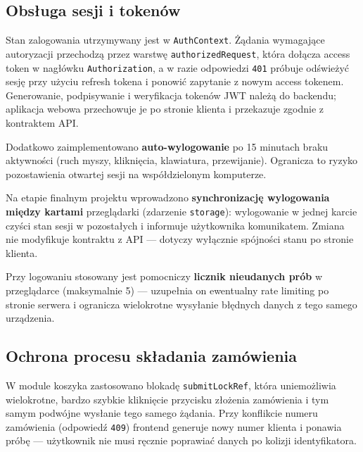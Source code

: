 \documentclass[12pt,a4paper]{report}
\newenvironment{calosc}{%
  \Needspace{17\baselineskip}%
  \begin{samepage}%
}{%
  \end{samepage}%
}
\begin{document}
\begin{calosc}
\section{Obsługa sesji i tokenów}

Stan zalogowania utrzymywany jest w \texttt{AuthContext}. Żądania wymagające autoryzacji przechodzą przez warstwę \texttt{authorizedRequest}, która dołącza access token w nagłówku \texttt{Authorization}, a w razie odpowiedzi \texttt{401} próbuje odświeżyć sesję przy użyciu refresh tokena i ponowić zapytanie z nowym access tokenem. Generowanie, podpisywanie i weryfikacja tokenów JWT należą do backendu; aplikacja webowa przechowuje je po stronie klienta i przekazuje zgodnie z kontraktem API.

Dodatkowo zaimplementowano \textbf{auto-wylogowanie} po 15 minutach braku aktywności (ruch myszy, kliknięcia, klawiatura, przewijanie). Ogranicza to ryzyko pozostawienia otwartej sesji na współdzielonym komputerze.

Na etapie finalnym projektu wprowadzono \textbf{synchronizację wylogowania między kartami} przeglądarki (zdarzenie \texttt{storage}): wylogowanie w jednej karcie czyści stan sesji w pozostałych i informuje użytkownika komunikatem. Zmiana nie modyfikuje kontraktu z API --- dotyczy wyłącznie spójności stanu po stronie klienta.

Przy logowaniu stosowany jest pomocniczy \textbf{licznik nieudanych prób} w przeglądarce (maksymalnie 5) --- uzupełnia on ewentualny rate limiting po stronie serwera i ogranicza wielokrotne wysyłanie błędnych danych z tego samego urządzenia.
\end{calosc}

\begin{calosc}
\section{Ochrona procesu składania zamówienia}

W module koszyka zastosowano blokadę \texttt{submitLockRef}, która uniemożliwia wielokrotne, bardzo szybkie kliknięcie przycisku złożenia zamówienia i tym samym podwójne wysłanie tego samego żądania. Przy konflikcie numeru zamówienia (odpowiedź \texttt{409}) frontend generuje nowy numer klienta i ponawia próbę --- użytkownik nie musi ręcznie poprawiać danych po kolizji identyfikatora.
\end{calosc}
\end{document}
